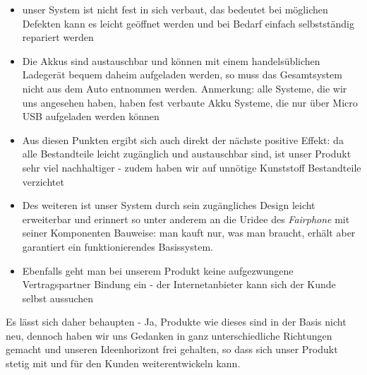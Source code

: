 \begin{itemize}
	\item unser System ist nicht fest in sich verbaut, das bedeutet bei möglichen Defekten kann es leicht geöffnet werden und bei Bedarf einfach selbstständig repariert werden
	\item Die Akkus sind austauschbar und können mit einem handelsüblichen Ladegerät bequem daheim aufgeladen werden, so muss das Gesamtsystem nicht aus dem Auto entnommen werden. Anmerkung: alle Systeme, die wir uns angesehen haben, haben fest verbaute Akku Systeme, die nur über Micro USB aufgeladen werden können
	\item Aus diesen Punkten ergibt sich auch direkt der nächste positive Effekt: da alle Bestandteile leicht zugänglich und austauschbar sind, ist unser Produkt sehr viel nachhaltiger - zudem haben wir auf unnötige Kunststoff Bestandteile verzichtet
	\item Des weiteren ist unser System durch sein zugängliches Design leicht erweiterbar und erinnert so unter anderem an die Uridee des \textit{Fairphone} mit seiner Komponenten Bauweise: man kauft nur, was man braucht, erhält aber garantiert ein funktionierendes Basissystem.
	\item Ebenfalls geht man bei unserem Produkt keine aufgezwungene Vertragspartner Bindung ein - der Internetanbieter kann sich der Kunde selbst aussuchen
\end{itemize}
Es lässt sich daher behaupten - Ja, Produkte wie dieses sind in der Basis nicht neu, dennoch haben wir uns Gedanken in ganz unterschiedliche Richtungen gemacht und unseren Ideenhorizont frei gehalten, so dass sich unser Produkt stetig mit und für den Kunden weiterentwickeln kann.
